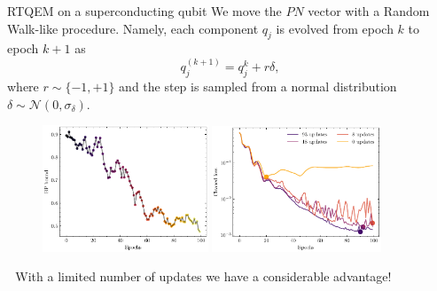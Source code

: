 \documentclass[8pt, xcolor={svgnames}, hyperref={linkcolor=black}, aspectratio=169]{beamer}
\begin{document}
\begin{frame}{RTQEM on a superconducting qubit}
We move the $PN$ vector with a Random Walk-like procedure. Namely, each component 
$q_j$ is evolved from epoch $k$ to epoch $k+1$ as
$$q_j^{(k+1)} = q_j^{k} + r\delta,$$
where $r\sim\{-1,+1\}$ and the step is sampled from a normal distribution 
$\delta\sim\mathcal{N}(0,\sigma_{\delta})$.
\pause
\begin{figure}
    \includegraphics[width=0.44\textwidth]{figures/bound_variation.pdf}%
    \pause
    \includegraphics[width=0.45\textwidth]{figures/cleaned_losses.pdf}
\end{figure}
\pause
\centering
\faEnvelope\,\, With a limited number of updates we have a considerable advantage!
\end{frame}
\end{document}
